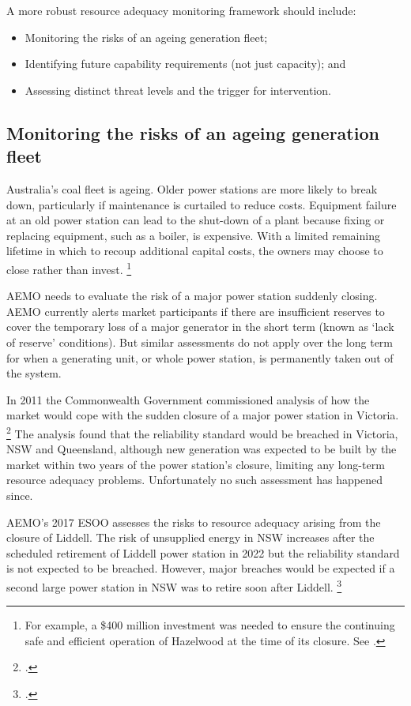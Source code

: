 \documentclass[FrontPage]{grattan}
\begin{document}
A more robust resource adequacy monitoring framework should include:
\begin{itemize}
    \item Monitoring the risks of an ageing generation fleet;
    \item Identifying future capability requirements (not just capacity); and
    \item Assessing distinct threat levels and the trigger for intervention.
\end{itemize}

\subsection{Monitoring the risks of an ageing generation fleet}\label{subsec:monitoring-the-risks-of-an-ageing-generation-fleet}
Australia’s coal fleet is ageing. Older power stations are more likely to break down, particularly if maintenance is curtailed to reduce costs. Equipment failure at an old power station can lead to the shut-down of a plant because fixing or replacing equipment, such as a boiler, is expensive. With a limited remaining lifetime in which to recoup additional capital costs, the owners may choose to close rather than invest.%
\footnote{For example, a \$400 million investment was needed to ensure the continuing safe and efficient operation of Hazelwood at the time of its closure. See \textcite{ABC2016HazelwoodClosing}.}

AEMO needs to evaluate the risk of a major power station suddenly closing. AEMO currently alerts market participants if there are insufficient reserves to cover the temporary loss of a major generator in the short term (known as `lack of reserve' conditions). But similar assessments do not apply over the long term for when a generating unit, or whole power station, is permanently taken out of the system.

In 2011 the Commonwealth Government commissioned analysis of how the market would cope with the sudden closure of a major power station in Victoria.%
\footcite{DRET2011NESA}
The analysis found that the reliability standard would be breached in Victoria, NSW and Queensland, although new generation was expected to be built by the market within two years of the power station's closure, limiting any long-term resource adequacy problems. Unfortunately no such assessment has happened since.

AEMO's 2017 ESOO assesses the risks to resource adequacy arising from the closure of Liddell. The risk of unsupplied energy in NSW increases after the scheduled retirement of Liddell power station in 2022 but the reliability standard is not expected to be breached. However, major breaches would be expected if a second large power station in NSW was to retire soon after Liddell.%
\footcite{AEMO2017ESOO}
\end{document}
